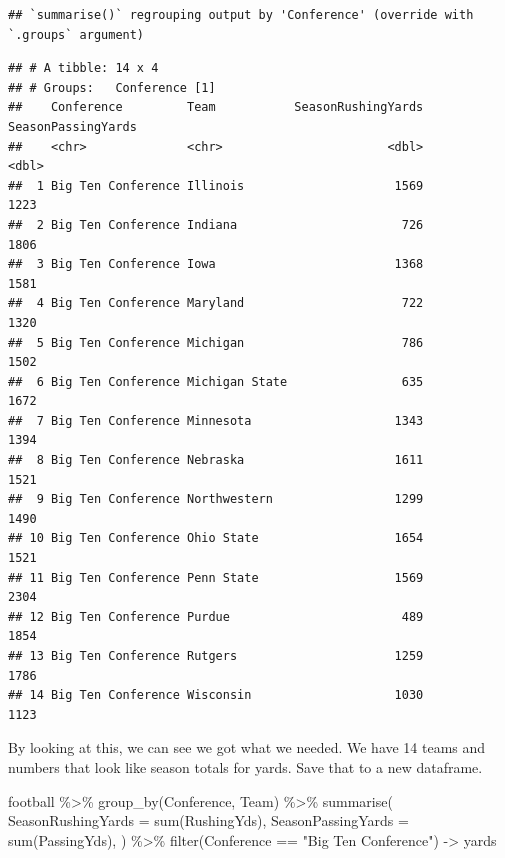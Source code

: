 \documentclass[
]{book}
\newenvironment{Shaded}{\begin{snugshade}}{\end{snugshade}}
\newcommand{\AttributeTok}[1]{\textcolor[rgb]{0.77,0.63,0.00}{#1}}
\newcommand{\FunctionTok}[1]{\textcolor[rgb]{0.00,0.00,0.00}{#1}}
\newcommand{\NormalTok}[1]{#1}
\newcommand{\OtherTok}[1]{\textcolor[rgb]{0.56,0.35,0.01}{#1}}
\newcommand{\SpecialCharTok}[1]{\textcolor[rgb]{0.00,0.00,0.00}{#1}}
\newcommand{\StringTok}[1]{\textcolor[rgb]{0.31,0.60,0.02}{#1}}
\begin{document}
\begin{verbatim}
## `summarise()` regrouping output by 'Conference' (override with `.groups` argument)
\end{verbatim}

\begin{verbatim}
## # A tibble: 14 x 4
## # Groups:   Conference [1]
##    Conference         Team           SeasonRushingYards SeasonPassingYards
##    <chr>              <chr>                       <dbl>              <dbl>
##  1 Big Ten Conference Illinois                     1569               1223
##  2 Big Ten Conference Indiana                       726               1806
##  3 Big Ten Conference Iowa                         1368               1581
##  4 Big Ten Conference Maryland                      722               1320
##  5 Big Ten Conference Michigan                      786               1502
##  6 Big Ten Conference Michigan State                635               1672
##  7 Big Ten Conference Minnesota                    1343               1394
##  8 Big Ten Conference Nebraska                     1611               1521
##  9 Big Ten Conference Northwestern                 1299               1490
## 10 Big Ten Conference Ohio State                   1654               1521
## 11 Big Ten Conference Penn State                   1569               2304
## 12 Big Ten Conference Purdue                        489               1854
## 13 Big Ten Conference Rutgers                      1259               1786
## 14 Big Ten Conference Wisconsin                    1030               1123
\end{verbatim}

By looking at this, we can see we got what we needed. We have 14 teams and numbers that look like season totals for yards. Save that to a new dataframe.

\begin{Shaded}
\begin{Highlighting}[]
\NormalTok{football }\SpecialCharTok{\%\textgreater{}\%} 
  \FunctionTok{group\_by}\NormalTok{(Conference, Team) }\SpecialCharTok{\%\textgreater{}\%} 
  \FunctionTok{summarise}\NormalTok{(}
    \AttributeTok{SeasonRushingYards =} \FunctionTok{sum}\NormalTok{(RushingYds),}
    \AttributeTok{SeasonPassingYards =} \FunctionTok{sum}\NormalTok{(PassingYds),}
\NormalTok{  ) }\SpecialCharTok{\%\textgreater{}\%} \FunctionTok{filter}\NormalTok{(Conference }\SpecialCharTok{==} \StringTok{"Big Ten Conference"}\NormalTok{) }\OtherTok{{-}\textgreater{}}\NormalTok{ yards}
\end{Highlighting}
\end{Shaded}
\end{document}
